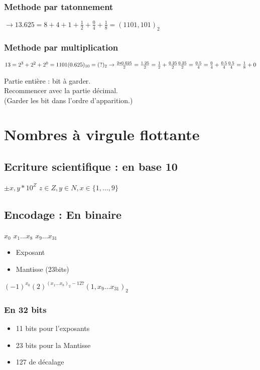 \documentclass[12pt]{article}
\begin{document}
\subsubsection*{Methode par tatonnement}
$ \rightarrow 13.625 = 8 + 4 + 1 + \frac{1}{2} + \frac{0}{4} + \frac{1}{8} = (1101,101)_2$

\subsubsection*{Methode par multiplication}

$ 13 = 2^{3} + 2^{2} + 2^{0} = 1101 \\
(0.625)_{10} = (?)_2 \rightarrow \frac{2*0.625}{2} = \frac{1.25}{2} = \frac{1}{2} + \frac{0.25}{2} \\
\frac{0.25}{2} = \frac{0.5}{4} = \frac{0}{4} + \frac{0.5}{4} \\
\frac{0.5}{4} = \frac{1}{8} + 0$
\vspace{10pt}

Partie entière : bit à garder. \\
Recommencer avec la partie décimal. \\
(Garder les bit dans l'ordre d'apparition.)

\section*{Nombres à virgule flottante}

\subsection*{Ecriture scientifique : en base 10}

$\pm x,y * 10^{Z}$ \quad $ z \in Z, y \in N, x \in \{1,\dots,9\}$

\subsection*{Encodage : En binaire}


\colorbox{yellow!20}{$x_0$} \colorbox{red!20}{$x_1 \dots x_8$} \colorbox{green!20}{$x_9 \dots x_{31}$}
\begin{itemize}
    \item \colorbox{red!20}{Exposant}
    \item \colorbox{green!20}{Mantisse (23bits)}
\end{itemize}
$(-1)^{x_0}(2)^{(x_1 \dots x_8)_2 - 127}(1,x_9 \dots x_{31})_2$

\subsubsection*{En 32 bits}
    \begin{itemize}
        \item 11 bits pour l'exposants
        \item 23 bits pour la Mantisse
        \item 127 de décalage
    \end{itemize}
\end{document}
